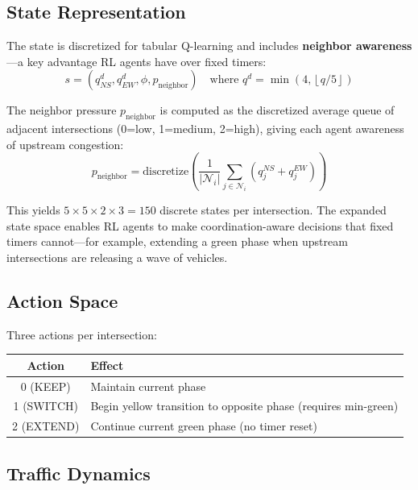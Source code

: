 \documentclass[12pt, a4paper]{article}
\begin{document}
\subsection{State Representation}

The state is discretized for tabular Q-learning and includes \textbf{neighbor awareness}---a key advantage RL agents have over fixed timers:
\begin{equation}
    s = (q_{NS}^d, q_{EW}^d, \phi, p_{\text{neighbor}}) \quad \text{where } q^d = \min\left(4, \left\lfloor q / 5 \right\rfloor\right)
\end{equation}

The neighbor pressure $p_{\text{neighbor}}$ is computed as the discretized average queue of adjacent intersections (0=low, 1=medium, 2=high), giving each agent awareness of upstream congestion:
\begin{equation}
    p_{\text{neighbor}} = \text{discretize}\left(\frac{1}{|\mathcal{N}_i|} \sum_{j \in \mathcal{N}_i} (q_j^{NS} + q_j^{EW})\right)
\end{equation}

This yields $5 \times 5 \times 2 \times 3 = 150$ discrete states per intersection. The expanded state space enables RL agents to make coordination-aware decisions that fixed timers cannot---for example, extending a green phase when upstream intersections are releasing a wave of vehicles.

\subsection{Action Space}

Three actions per intersection:
\begin{center}
\begin{tabular}{cl}
    \toprule
    \textbf{Action} & \textbf{Effect} \\
    \midrule
    0 (KEEP) & Maintain current phase \\
    1 (SWITCH) & Begin yellow transition to opposite phase (requires min-green) \\
    2 (EXTEND) & Continue current green phase (no timer reset) \\
    \bottomrule
\end{tabular}
\end{center}

\subsection{Traffic Dynamics}
\end{document}
